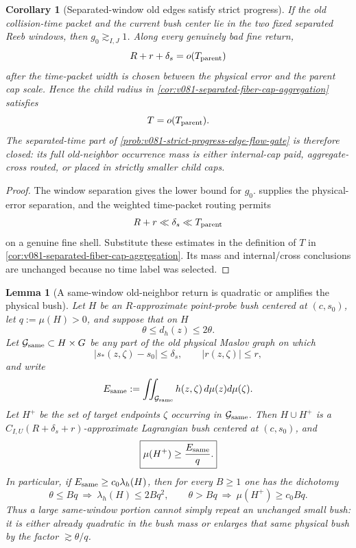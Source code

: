 \documentclass[10pt]{article}
\newtheorem{lemma}[theorem]{Lemma}
\newtheorem{corollary}[theorem]{Corollary}
\begin{document}
\begin{corollary}[Separated-window old edges satisfy strict progress]
\label{cor:v081-separated-window-strict-progress}
If the old collision-time packet and the current bush center lie in the two fixed separated Reeb
windows, then \(g_0\gtrsim_{I,J}1\).  Along every genuinely bad fine return,
\[
R+r+\delta_s=o(T_{\rm parent})
\]
after the time-packet width is chosen between the physical error and the parent cap scale.  Hence
the child radius in
\cref{cor:v081-separated-fiber-cap-aggregation} satisfies
\[
T=o(T_{\rm parent}).
\]
The separated-time part of
\cref{prob:v081-strict-progress-edge-flow-gate} is therefore closed: its full old-neighbor
occurrence mass is either internal-cap paid, aggregate-cross routed, or placed in strictly smaller
child caps.
\end{corollary}

\begin{proof}
The window separation gives the lower bound for \(g_0\).   supplies the physical-error separation, and the
weighted time-packet routing permits
\[
R+r\ll\delta_s\ll T_{\rm parent}
\]
on a genuine fine shell.  Substitute these estimates in the definition of \(T\) in
\cref{cor:v081-separated-fiber-cap-aggregation}.  Its mass and internal/cross conclusions are
unchanged because no time label was selected.
\end{proof}

\begin{lemma}[A same-window old-neighbor return is quadratic or amplifies the physical bush]
\label{lem:v081-same-window-edge-flow-amplification}
Let \(H\) be an \(R\)-approximate point-probe bush centered at \((c,s_0)\), let
\(q:=\mu(H)>0\), and suppose that on \(H\)
\[
\theta\le d_h(z)\le2\theta.
\]
Let \(\mathcal G_{\rm same}\subset H\times G\) be any part of the old physical Maslov graph on
which
\[
|s_*(z,\zeta)-s_0|\le\delta_s,
\qquad
|r(z,\zeta)|\le r,
\]
and write
\[
E_{\rm same}
:=
\iint_{\mathcal G_{\rm same}}h(z,\zeta)\,d\mu(z)d\mu(\zeta).
\]
Let \(H^+\) be the set of target endpoints \(\zeta\) occurring in
\(\mathcal G_{\rm same}\).  Then \(H\cup H^+\) is a
\(C_{I,U}(R+\delta_s+r)\)-approximate Lagrangian bush centered at \((c,s_0)\), and
\begin{equation}
\label{eq:v081-same-window-target-mass}
\boxed{
\mu(H^+)\ge\frac{E_{\rm same}}q.
}
\end{equation}
In particular, if \(E_{\rm same}\ge c_0\lambda_h(H)\), then for every \(B\ge1\) one has the
dichotomy
\begin{equation}
\label{eq:v081-same-window-quadratic-or-amplified}
\boxed{
\theta\le Bq
\ \Longrightarrow\
\lambda_h(H)\le2Bq^2,
\qquad
\theta>Bq
\ \Longrightarrow\
\mu(H^+)\ge c_0Bq.
}
\end{equation}
Thus a large same-window portion cannot simply repeat an unchanged small bush: it is either already
quadratic in the bush mass or enlarges that same physical bush by the factor
\(\gtrsim\theta/q\).
\end{lemma}
\end{document}
